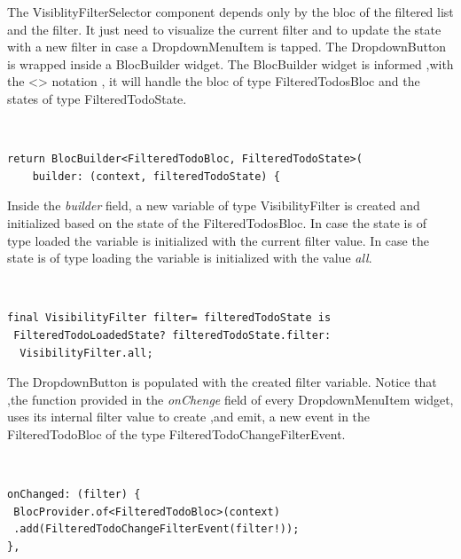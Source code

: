 The VisiblityFilterSelector component depends only by the bloc of the filtered list and the filter. It just need to visualize the current filter and to update the state with a new filter in case a DropdownMenuItem is tapped. The DropdownButton is  wrapped inside a BlocBuilder widget. The BlocBuilder widget is informed ,with the <> notation , it will handle the bloc of type FilteredTodosBloc and the states of type FilteredTodoState. 
\begin{code}
\mbox{}\\
 \mbox{}
\label{code:2.14}
\begin{verbatim}
return BlocBuilder<FilteredTodoBloc, FilteredTodoState>(
    builder: (context, filteredTodoState) {
\end{verbatim}
\mbox{}
\end{code}

Inside the \textit{builder }field, a new variable of type VisibilityFilter is created and initialized based on the state of the FilteredTodosBloc. In case the state is of type loaded the variable is initialized with the current filter value. In case the state is of type loading the variable is initialized with the value \textit{all}.
\begin{code}
\mbox{}\\
 \mbox{}
\label{code:2.14}
\begin{verbatim}
final VisibilityFilter filter= filteredTodoState is
 FilteredTodoLoadedState? filteredTodoState.filter:
  VisibilityFilter.all;
\end{verbatim}
\mbox{}
\end{code}

The DropdownButton is populated with the created filter variable. Notice that ,the function provided in the \textit{onChenge} field of every DropdownMenuItem widget, uses its internal filter value to create ,and  emit, a new event in the FilteredTodoBloc of the type FilteredTodoChangeFilterEvent.
\begin{code}
\mbox{}\\
 \mbox{}
\label{code:2.14}
\begin{verbatim}
onChanged: (filter) {
 BlocProvider.of<FilteredTodoBloc>(context)
 .add(FilteredTodoChangeFilterEvent(filter!));
},
\end{verbatim}
\mbox{}
\end{code}
